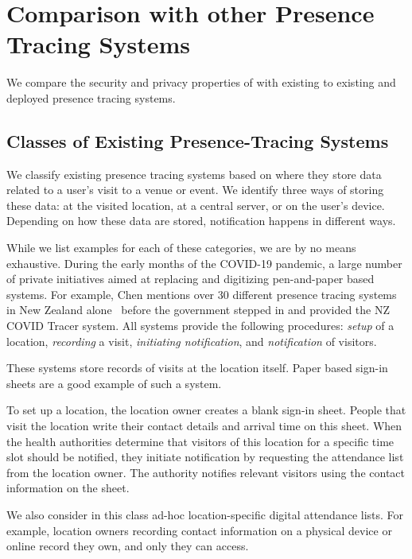 \section{Comparison with other Presence Tracing Systems}

We compare the security and privacy properties of \name with existing to
existing and deployed presence tracing systems.

\subsection{Classes of Existing Presence-Tracing Systems}
\label{sec:existing-systems}

We classify existing presence tracing systems based on where they store data related to a user's visit to a venue or event. We identify three ways of storing these data: at the visited location, at a central server, or on the user's device. Depending on how these data are stored, notification happens in different ways. 

While we list examples for each of these categories, we are by no means exhaustive. During the early months of the COVID-19 pandemic, a large number of private initiatives aimed at replacing and digitizing pen-and-paper based systems. For example, Chen mentions over 30 different presence tracing systems in New Zealand alone~\cite{Chen20} before the government stepped in and provided the NZ COVID Tracer system. All systems provide the following procedures: \emph{setup} of a location, \emph{recording} a visit, \emph{initiating notification}, and \emph{notification} of visitors.

 These systems store records of visits at the location itself. Paper based sign-in sheets are a good example of such a system.

To set up a location, the location owner creates a blank sign-in sheet. People that visit the location write their contact details and arrival time on this sheet. When the health authorities determine that visitors of this location for a specific time slot should be notified, they initiate notification by requesting the attendance list from the location owner. The authority notifies relevant visitors using the contact information on the sheet.

We also consider in this class ad-hoc location-specific digital attendance lists. For example, location owners recording contact information on a physical device or online record they own, and only they can access.

